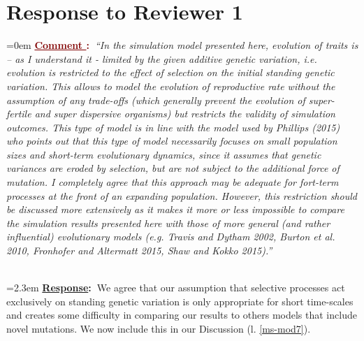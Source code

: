 \documentclass[12pt]{article}
\newcounter{cN}
\newcommand{\comment}[1]{
	\vspace{2em}
	\refstepcounter{cN} %
	\noindent \hangindent=0em \textbf{\textcolor{Maroon}{\uline{Comment \thecN}:~}}\emph{``#1''}
	}
\newcommand{\response}[1]{
	\\[0.25em]
	\hangindent=2.3em \textbf{\textcolor{NavyBlue}{\uline{Response}:~}}#1
	}
\begin{document}
\section{Response to Reviewer 1}
\vspace{-2em}

\comment{In the simulation model presented here, evolution of traits is – as I understand it - limited by the given additive genetic variation, i.e. evolution is restricted to the effect of selection on the initial standing genetic variation.
This allows to model the evolution of reproductive rate without the assumption of any trade-offs (which generally prevent the evolution of super-fertile and super dispersive organisms) but restricts the validity of simulation outcomes.
This type of model is in line with the model used by Phillips (2015) who points out that this type of model necessarily focuses on small population sizes and short-term evolutionary dynamics, since it assumes that genetic variances are eroded by selection, but are not subject to the additional force of mutation.
I completely agree that this approach may be adequate for fort-term processes at the front of an expanding population.
However, this restriction should be discussed more extensively as it makes it more or less impossible to compare the simulation results presented here with those of more general (and rather influential) evolutionary models (e.g. Travis and Dytham 2002, Burton et al. 2010, Fronhofer and Altermatt 2015, Shaw and Kokko 2015).}
\response{We agree that our assumption that selective processes act exclusively on standing genetic variation is only appropriate for short time-scales and creates some difficulty in comparing our results to others models that include novel mutations. We now include this in our Discussion (l. \ref{ms-mod7}).}
\end{document}
